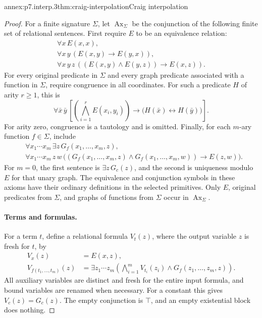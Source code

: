 \begin{annexitem}{annex:p7.interp.3}{thm:craig-interpolation}{Craig interpolation}
\begin{proof}
For a finite signature \(\Sigma\), let \(\operatorname{Ax}_\Sigma\)
be the conjunction of the following finite set of relational sentences.
First require \(E\) to be an equivalence relation:
\[
\begin{gathered}
 \forall x\,E(x,x),\\
 \forall x\,y\,(E(x,y)\to E(y,x)),\\
 \forall x\,y\,z\,
       ((E(x,y)\land E(y,z))\to E(x,z)).
\end{gathered}
\]
For every original predicate in \(\Sigma\) and every graph predicate
associated with a function in \(\Sigma\), require congruence in all
coordinates.  For such a predicate \(H\) of arity \(r\geq1\), this is
\[
 \forall\bar x\,\bar y\,
 \left[
  \left(\bigwedge_{i=1}^{r}E(x_i,y_i)\right)
  \to\bigl(H(\bar x)\leftrightarrow H(\bar y)\bigr)
 \right].
\]
For arity zero, congruence is a tautology and is omitted.
Finally, for each \(m\)-ary function \(f\in\Sigma\), include
\[
\begin{aligned}
 &\forall x_1\cdots x_m\,\exists z\,
                   G_f(x_1,\ldots,x_m,z),\\
 &\forall x_1\cdots x_m\,z\,w\,
 \bigl((G_f(x_1,\ldots,x_m,z)\land
        G_f(x_1,\ldots,x_m,w))\to E(z,w)\bigr).
\end{aligned}
\]
For \(m=0\), the first sentence is \(\exists z\,G_c(z)\), and the
second is uniqueness modulo \(E\) for that unary graph.
The equivalence and conjunction symbols in these axioms have their
ordinary definitions in the selected primitives.
Only \(E\), original predicates from \(\Sigma\), and graphs of
functions from \(\Sigma\) occur in \(\operatorname{Ax}_\Sigma\).

\paragraph{Terms and formulas.}
For a term \(t\), define a relational formula \(V_t(z)\), where the
output variable \(z\) is fresh for \(t\), by
\[
\begin{aligned}
 V_x(z)&=E(x,z),\\
 V_{f(t_1,\ldots,t_m)}(z)
   &=\exists z_1\cdots z_m
       \left(\bigwedge_{i=1}^{m}V_{t_i}(z_i)
                       \land G_f(z_1,\ldots,z_m,z)\right).
\end{aligned}
\]
All auxiliary variables are distinct and fresh for the entire input
formula, and bound variables are renamed when necessary.
For a constant this gives \(V_c(z)=G_c(z)\).
The empty conjunction is \(\top\), and an empty existential block
does nothing.


\end{proof}
\end{annexitem}
